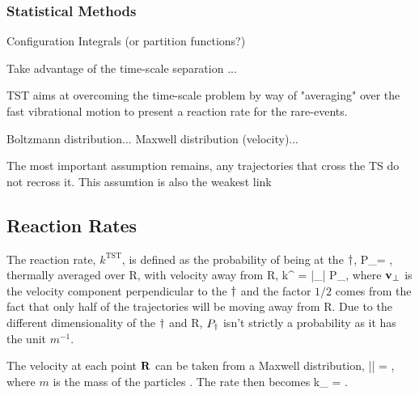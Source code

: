 \subsubsection{Statistical Methods}

\bit
\item Configuration Integrals (or partition functions?)
\eit

Take advantage of the time-scale separation ...

TST aims at overcoming the time-scale problem by way of "averaging" over the fast vibrational motion to present a reaction rate for the rare-events.

Boltzmann distribution...
Maxwell distribution (velocity)...


\incomplete

The most important assumption remains, any trajectories that cross the TS do not recross it.
This assumtion is also the weakest link \expand

\subsection{Reaction Rates}
The reaction rate, $k^\text{TST}$, is defined as the probability of being at the $\dagger$,
P_\ts = ,
\eeq
thermally averaged over R, with velocity away from R,\citemiss
{}
k^ = |_\perp| P_\ts,
\eeq
where ${\mathrm{\mathbf{\bm{v}}}}_\perp$ is the velocity component perpendicular to the $\dagger$ and the factor $1/2$ comes from the fact that only half of the trajectories will be moving away from R.
Due to the different dimensionality of the $\dagger$ and R, $P_\dagger$ isn't strictly a probability as it has the unit $\unit{m^{-1}}$. \expand

The velocity at each point ${\mathrm{\mathbf{\bm{R}}}}$ can be taken from a Maxwell distribution, 
\langle || \rangle = ,
\eeq
where $m$ is the mass of the particles .
The rate then becomes
k_ =  . \quad \text{\expand}
\eeq

\placeholder

